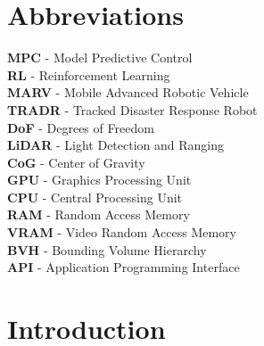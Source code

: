 \documentclass[a4paper,12pt]{article}
\begin{document}
\frontMatter


\section*{Abbreviations}
\label{sec:abbreviations}

\textbf{MPC} - Model Predictive Control \\ 
\textbf{RL} - Reinforcement Learning \\
\textbf{MARV} - Mobile Advanced Robotic Vehicle \\
\textbf{TRADR} - Tracked Disaster Response Robot \\
\textbf{DoF} - Degrees of Freedom \\
\textbf{LiDAR} - Light Detection and Ranging \\
\textbf{CoG} - Center of Gravity \\
\textbf{GPU} - Graphics Processing Unit \\
\textbf{CPU} - Central Processing Unit \\
\textbf{RAM} - Random Access Memory \\
\textbf{VRAM} - Video Random Access Memory \\
\textbf{BVH} - Bounding Volume Hierarchy \\
\textbf{API} - Application Programming Interface \\

\clearpage
\pagestyle{fancy}


\tableofcontents %


\clearpage

\section{Introduction}
\label{sec:introduction}
\end{document}
